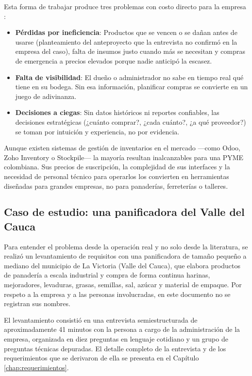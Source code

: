 Esta forma de trabajar produce tres problemas con costo directo para la empresa \cite{ballou2004logistica}:

\begin{itemize}
    \item \textbf{Pérdidas por ineficiencia}: Productos que se vencen o se dañan antes de usarse (planteamiento del anteproyecto que la entrevista no confirmó en la empresa del caso), falta de insumos justo cuando más se necesitan y compras de emergencia a precios elevados porque nadie anticipó la escasez.
    \item \textbf{Falta de visibilidad}: El dueño o administrador no sabe en tiempo real qué tiene en su bodega. Sin esa información, planificar compras se convierte en un juego de adivinanza.
    \item \textbf{Decisiones a ciegas}: Sin datos históricos ni reportes confiables, las decisiones estratégicas (¿cuánto comprar?, ¿cada cuánto?, ¿a qué proveedor?) se toman por intuición y experiencia, no por evidencia.
\end{itemize}

Aunque existen sistemas de gestión de inventarios en el mercado —como Odoo, Zoho Inventory o Stockpile— la mayoría resultan inalcanzables para una PYME colombiana. Sus precios de suscripción, la complejidad de sus interfaces y la necesidad de personal técnico para operarlos los convierten en herramientas diseñadas para grandes empresas, no para panaderías, ferreterías o talleres.\cite{bbva2024mipymes}

\subsection{Caso de estudio: una panificadora del Valle del Cauca}

Para entender el problema desde la operación real y no solo desde la literatura, se realizó un levantamiento de requisitos con una panificadora de tamaño pequeño a mediano del municipio de La Victoria (Valle del Cauca), que elabora productos de panadería a escala industrial y compra de forma continua harinas, mejoradores, levaduras, grasas, semillas, sal, azúcar y material de empaque. Por respeto a la empresa y a las personas involucradas, en este documento no se registran sus nombres.

El levantamiento consistió en una entrevista semiestructurada de aproximadamente 41 minutos con la persona a cargo de la administración de la empresa, organizada en diez preguntas en lenguaje cotidiano y un grupo de preguntas técnicas depuradas. El detalle completo de la entrevista y de los requerimientos que se derivaron de ella se presenta en el Capítulo \ref{chap:requerimientos}.

